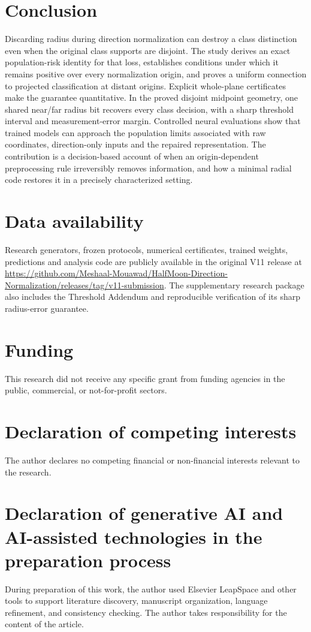 \documentclass[12pt,a4paper]{article}
\begin{document}
\section{Conclusion}
Discarding radius during direction normalization can destroy a class distinction even when the original class supports are disjoint. The study derives an exact population-risk identity for that loss, establishes conditions under which it remains positive over every normalization origin, and proves a uniform connection to projected classification at distant origins. Explicit whole-plane certificates make the guarantee quantitative. In the proved disjoint midpoint geometry, one shared near/far radius bit recovers every class decision, with a sharp threshold interval and measurement-error margin. Controlled neural evaluations show that trained models can approach the population limits associated with raw coordinates, direction-only inputs and the repaired representation. The contribution is a decision-based account of when an origin-dependent preprocessing rule irreversibly removes information, and how a minimal radial code restores it in a precisely characterized setting.

\section*{Data availability}
Research generators, frozen protocols, numerical certificates, trained weights, predictions and analysis code are publicly available in the original V11 release at \url{https://github.com/Meshaal-Mouawad/HalfMoon-Direction-Normalization/releases/tag/v11-submission}. The supplementary research package also includes the Threshold Addendum and reproducible verification of its sharp radius-error guarantee.

\section*{Funding}
This research did not receive any specific grant from funding agencies in the public, commercial, or not-for-profit sectors.

\section*{Declaration of competing interests}
The author declares no competing financial or non-financial interests relevant to the research.

\section*{Declaration of generative AI and AI-assisted technologies in the preparation process}
During preparation of this work, the author used Elsevier LeapSpace and other tools to support literature discovery, manuscript organization, language refinement, and consistency checking. The author takes responsibility for the content of the article.



\end{document}

